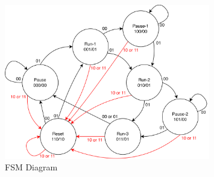 \begin{figure}[H]
    \centering
    \includegraphics[width=0.8\textwidth]{Figures/FSM-diagram.png}
    \caption{FSM Diagram}
    \label{fig:fsm_diagram}
\end{figure}

